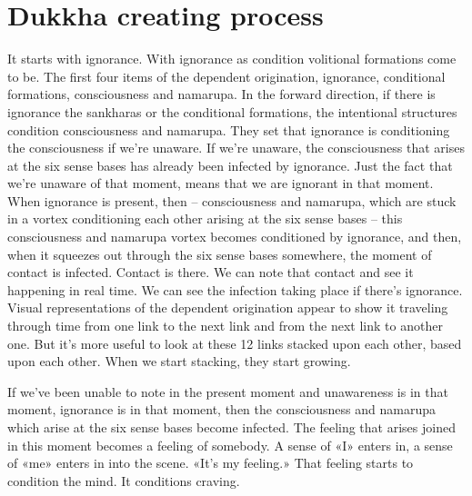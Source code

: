\documentclass[letterpaper,10pt,english]{sphinxmanual}
\begin{document}
\section{Dukkha creating process}
\label{\detokenize{6-b:dukkha-creating-process}}
\sphinxAtStartPar
It starts with ignorance. With ignorance as condition volitional formations  come  to  be.  The  first  four  items  of  the  dependent  origination,  ignorance, conditional formations, consciousness and nama\sphinxhyphen{}rupa. In the forward
direction, if there is ignorance the sankharas or the conditional formations,
the intentional structures condition consciousness and nama\sphinxhyphen{}rupa. They set
that  ignorance  is  conditioning  the  consciousness
if
we’re  unaware.  If  we’re  unaware,  the  consciousness  that  arises  at  the  six
sense bases has already been infected by ignorance. Just the fact that we’re
unaware of that moment, means that we are ignorant in that moment. When
ignorance is present, then – consciousness and nama\sphinxhyphen{}rupa, which are stuck
in a vortex conditioning each other arising at the six sense bases – this consciousness  and  nama\sphinxhyphen{}rupa  vortex  becomes  conditioned  by  ignorance,  and
then,  when  it  squeezes  out  through  the  six  sense  bases  somewhere,  the
moment of contact is infected. Contact is there. We can note that contact and
see it happening in real time. We can see the infection taking place if there’s
ignorance.
Visual representations of the dependent origination appear to show it traveling through time from one link to the next link and from the next link to
another one. But it’s more useful to look at these 12 links stacked upon each
other, based upon each other. When we start stacking, they start growing.

\sphinxAtStartPar
{}  If we’ve been unable to note in the present moment and unawareness
is in that moment, ignorance is in that moment, then the consciousness and
nama\sphinxhyphen{}rupa which arise at the six sense bases become infected. The feeling
that arises joined in this moment becomes a feeling of somebody. A sense of
«I» enters in, a sense of «me» enters in into the scene. «It’s my feeling.» That
feeling starts to condition the mind. It conditions craving.
\end{document}

